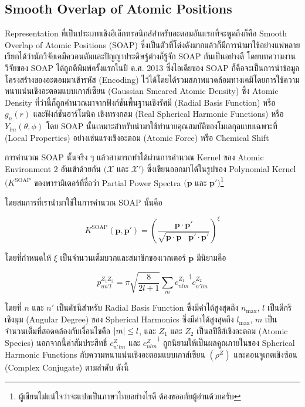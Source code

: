 \subsection{Smooth Overlap of Atomic Positions}
\label{ssec:soap}

Representation ที่เป็นประเภทเชิงอิเล็กทรอนิกส์สำหรับอะตอมอันแรกที่จะพูดถึงก็คือ Smooth Overlap of Atomic Positions (SOAP) 
ซึ่งเป็นตัวที่โด่งดังมากแล้วก็มีการนำมาใช้อย่างแพ่หลาย เรียกได้ว่านักวิจัยเคมีควอนตัมและปัญญาประดิษฐ์ต่างก็รู้จัก SOAP กันเป็นอย่างดี
โดยบทความงานวิจัยของ SOAP ได้ถูกตีพิมพ์ครั้งแรกในปี ค.ศ. 2013 ซึ่งไอเดียของ SOAP ก็คือจะเป็นการนำข้อมูลโครงสร้างของอะตอมมาเข้ารหัส 
(Encoding) ไว้ได้โดยได้รวมสภาพแวดล้อมทางเคมีโดยการใช้ความหนาแน่นเชิงอะตอมแบบเกาส์เซียน (Gaussian Smeared Atomic Density) 
ซึ่ง Atomic Density ที่ว่านี้ก็ถูกคำนวณมาจากฟังก์ชันพื้นฐานเชิงรัศมี (Radial Basis Function) หรือ $g_{n}(r)$ และฟังก์ชันฮาร์โมนิค%
เชิงทรงกลม (Real Spherical Harmonic Functions) หรือ $Y_{lm}(\theta, \phi)$\autocite{bartok2013,de2016}
โดย SOAP นั้นเหมาะสำหรับนำมาใช้ทำนายคุณสมบัติของโมเลกุลแบบเฉพาะที่ (Local Properties) อย่างเช่นแรงเชิงอะตอม (Atomic Force) 
หรือ Chemical Shift

การคำนวณ SOAP นั้นจริง ๆ แล้วสามารถทำได้ผ่านการคำนวณ Kernel ของ Atomic Environment 2 อันเข้าด้วยกัน $(\mathcal{X}$ และ 
$\mathcal{X}')$ ซึ่งเขียนออกมาได้ในรูปของ Polynomial Kernel $(K^\text{SOAP}$ ของพารามิเตอร์ที่ชื่อว่า Partial Power 
Spectra $(\bm{p}$ และ $\bm{p}')$\footnote{ผู้เขียนไม่แน่ใจว่าจะแปลเป็นภาษาไทยอย่างไรดี ต้องขออภัยผู้อ่านด้วยครับ} 

โดยสมการที่เรานำมาใช้ในการคำนวณ SOAP นั้นคือ

\begin{equation}\label{eq:soap}
    K^\text{SOAP}(\bm{p}, \bm{p'}) = \left( \frac{\bm{p} \cdot \bm{p'}}{\sqrt{ 
    \bm{p} \cdot \bm{p} \;\;\; \bm{p'} \cdot \bm{p'}}}\right)^{\xi}
\end{equation}

\noindent โดยที่กำหนดให้ $\xi$ เป็นจำนวนเต็มบวกและสมาชิกของเวกเตอร์ $\bm{p}$ มีนิยามคือ 

\begin{equation}\label{eq:soap_power_spec}
    p^{Z_1 Z_2}_{n n' l} = \pi \sqrt{\frac{8}{2l+1}}\sum_m {c^{Z_1}_{n l m}}^{\dagger} c^{Z_2}_{n' l m}
\end{equation}

\noindent โดยที่ $n$ และ $n'$ เป็นดัชนีสำหรับ Radial Basis Function ซึ่งมีค่าได้สูงสุดถึง $n_{\max}$, $l$ เป็นดีกรีเชิงมุม 
(Angular Degree) ของ Spherical Harmonics ซึ่งมีค่าได้สูงสุดถึง $l_{\max}$, $m$ เป็นจำนวนเต็มที่สอดคล้องกับเงื่อนไขคือ $\abs{m} 
\leq l$, และ $Z_{1}$ และ $Z_{2}$ เป็นสปีชีส์เชิงอะตอม (Atomic Species) นอกจากนี้ค่าสัมประสิทธิ์ $c^{Z}_{n'lm}$ และ 
${c^{Z}_{nlm}}^{\dagger}$ ถูกนิยามให้เป็นผลคูณภายในของ Spherical Harmonic Functions กับความหนาแน่นเชิงอะตอมแบบเกาส์เซียน 
$(\rho^Z)$ และคอนจูเกตเชิงซ้อน (Complex Conjugate) ตามลำดับ\autocite{de2016} ดังนี้

